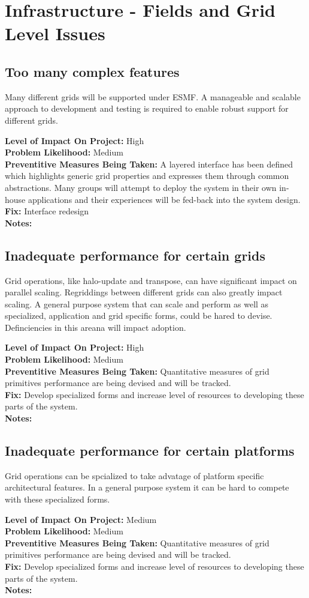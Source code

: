 \documentclass[english]{article}
\newcommand{\req}[1]{\section{\hspace{.2in}#1}}
\newcommand{\sreq}[1]{\subsection{\hspace{.2in}#1}}
\newenvironment
{reqlist}
{\begin{list} {} {} \rm \item[]}
{\end{list}}
\begin{document}
\req{Infrastructure - Fields and Grid Level Issues}
\sreq{Too many complex features}
Many different grids will be supported under ESMF. A manageable and scalable approach
to development and testing is required to enable robust support for different grids.
\begin{reqlist}
{\bf Level of Impact On Project:} High \\
{\bf Problem Likelihood:} Medium \\
{\bf Preventitive Measures Being Taken:} A layered interface has been defined 
which highlights generic grid properties and expresses them through common abstractions.
Many groups will attempt to deploy the system in their own in-house
applications and their experiences will be fed-back into the system design.\\
{\bf Fix:} Interface redesign \\
{\bf Notes:} 
\end{reqlist}
\sreq{Inadequate performance for certain grids}
Grid operations, like halo-update and transpose, can have significant impact on parallel scaling.
Regriddings between different grids can also greatly impact scaling.
A general purpose system that can scale and perform as well as specialized, application and
grid specific forms, could be hared to devise. Definciencies in this areana will
impact adoption.
\begin{reqlist} 
{\bf Level of Impact On Project:} High \\ 
{\bf Problem Likelihood:} Medium \\
{\bf Preventitive Measures Being Taken:} Quantitative measures of grid primitives
performance are being devised and will be tracked.\\
{\bf Fix:} Develop specialized forms and increase level of resources
to developing these parts of the system.\\
{\bf Notes:} 
\end{reqlist}
\sreq{Inadequate performance for certain platforms}
Grid operations can be spcialized to take advatage of platform specific
architectural features. In a general purpose system it can be hard to compete with these
specialized forms.
\begin{reqlist}
{\bf Level of Impact On Project:} Medium \\
{\bf Problem Likelihood:} Medium \\
{\bf Preventitive Measures Being Taken:} Quantitative measures of grid primitives
performance are being devised and will be tracked.\\
{\bf Fix:} Develop specialized forms and increase level of resources
to developing these parts of the system.\\
{\bf Notes:} 
\end{reqlist}
\end{document}
